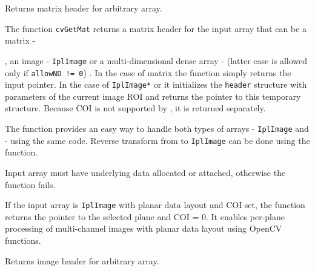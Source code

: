 Returns matrix header for arbitrary array.


\begin{description}
\end{description}

The function \texttt{cvGetMat} returns a matrix header for the input array that can be a matrix - 

, an image - \texttt{IplImage} or a multi-dimensional dense array -  (latter case is allowed only if \texttt{allowND != 0}) . In the case of matrix the function simply returns the input pointer. In the case of \texttt{IplImage*} or  it initializes the \texttt{header} structure with parameters of the current image ROI and returns the pointer to this temporary structure. Because COI is not supported by , it is returned separately.

The function provides an easy way to handle both types of arrays - \texttt{IplImage} and  - using the same code. Reverse transform from  to \texttt{IplImage} can be done using the  function.

Input array must have underlying data allocated or attached, otherwise the function fails.

If the input array is \texttt{IplImage} with planar data layout and COI set, the function returns the pointer to the selected plane and COI = 0. It enables per-plane processing of multi-channel images with planar data layout using OpenCV functions.

\label{GetImage}

Returns image header for arbitrary array.


